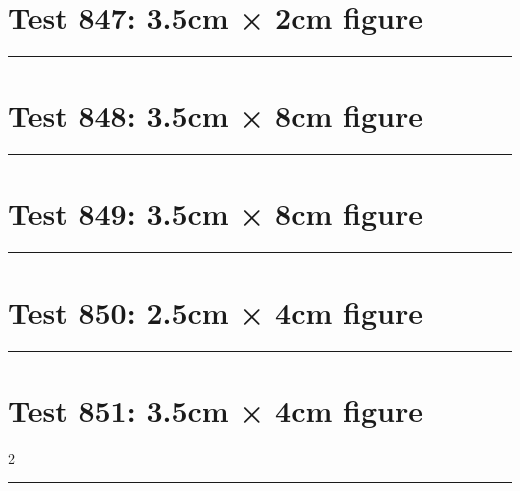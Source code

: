\documentclass[a4paper,11pt]{article}
\begin{document}
\section*{Test 847: 3.5cm × 2cm figure}
\begin{swarmwrap}%
  \begin{minipage}[t]{3cm}
    \centering
    \rule{\linewidth}{2cm}
  \end{minipage}%
\end{swarmwrap}%
\swarmwrapnext
\lipsum[148]
\lipsum[149]
\lipsum[150]
\lipsum[1]
\section*{Test 848: 3.5cm × 8cm figure}
\begin{swarmwrap}%
  \begin{minipage}[t]{3cm}
    \centering
    \rule{\linewidth}{8cm}
  \end{minipage}%
\end{swarmwrap}%
\swarmwrapnext
\lipsum[9]
\lipsum[10]
\lipsum[11]
\lipsum[12]
\lipsum[13]
\lipsum[14]
\section*{Test 849: 3.5cm × 8cm figure}
\begin{swarmwrap}%
  \begin{minipage}[t]{3cm}
    \centering
    \rule{\linewidth}{8cm}
  \end{minipage}%
\end{swarmwrap}%
\swarmwrapnext
\lipsum[92]
\lipsum[93]
\lipsum[94]
\lipsum[95]
\section*{Test 850: 2.5cm × 4cm figure}
\begin{swarmwrap}%
  \begin{minipage}[t]{2cm}
    \centering
    \rule{\linewidth}{4cm}
  \end{minipage}%
\end{swarmwrap}%
\swarmwrapnext
\lipsum[73]
\lipsum[74]
\lipsum[75]
\lipsum[76]
\lipsum[77]
\section*{Test 851: 3.5cm × 4cm figure}
\begin{multicols}{2}
  \begin{swarmwrap}%
    \begin{minipage}[t]{3cm}
      \centering
      \rule{\linewidth}{4cm}
    \end{minipage}%
  \end{swarmwrap}%
  \swarmwrapnext
  \lipsum[64]
  \lipsum[65]
  \lipsum[66]
\end{multicols}
\end{document}
